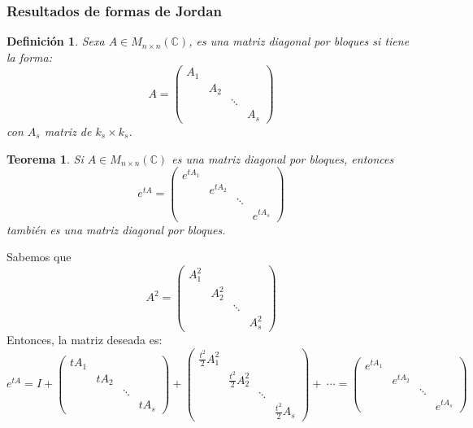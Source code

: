 \documentclass[11pt, a4paper,twoside]{article}
\makeatletter
\theoremstyle{theorem-style}  %
\newtheorem{theorem}{Teorema}[section]  %
\renewenvironment{proof}[1][\proofname]{\par
	\pushQED{\qed}%
	\normalfont \topsep6\p@\@plus6\p@\relax
	\list{}{%
		\settowidth{\leftmargin}{\quad:\hskip\labelsep}%
		\setlength{\labelwidth}{0pt}%
		\setlength{\itemindent}{-\leftmargin}%
	}%
	\item[\hskip\labelsep\itshape#1\@addpunct{:}]\ignorespaces
}{%
	\popQED\endlist\@endpefalse
}
\theoremstyle{definition-style}
\newtheorem{definition}{Definición}[section]
\theoremstyle{example-style}
\makeatother
\begin{document}
\subsubsection{Resultados de formas de Jordan}
\begin{definition}
	Sexa $ A\in M_{n\times n}(\mathbb{C}) $, es una matriz diagonal por bloques si tiene la forma:
	\[ A=\begin{pmatrix}
	A_{1}  \\
	& A_2  \\
	& & \ddots \\
	& & & A_s
	\end{pmatrix} \]
	con $ A_s $ matriz de $ k_s\times k_s $.
\end{definition}
\begin{theorem}
	Si $ A\in M_{n\times n}(\mathbb{C}) $ es una matriz diagonal por bloques, entonces 
	\[ e^{tA}= \begin{pmatrix}
	e^{tA_1}  \\
	& e^{tA_2}  \\
	& & \ddots \\
	& & & e^{tA_s}
	\end{pmatrix}\] también es una matriz diagonal por bloques.
\end{theorem}
\begin{proof}
	Sabemos que 
	\[ A^2=\begin{pmatrix}
	A_{1}^2  \\
	& A_2^2  \\
	& & \ddots \\
	& & & A_s^2
	\end{pmatrix} \]
	Entonces, la matriz deseada es:
	\[ e^{tA}=I+ \begin{pmatrix}
	tA_{1}  \\
	& tA_2  \\
	& & \ddots \\
	& & &t A_s
	\end{pmatrix} + \begin{pmatrix}
	\frac{t^2}{2}A_{1}^2  \\
	& \frac{t^2}{2}A_2^2  \\
	& & \ddots \\
	& & &\frac{t^2}{2} A_s
	\end{pmatrix}+ \ \cdots= \begin{pmatrix}
	e^{tA_1}  \\
	& e^{tA_2}  \\
	& & \ddots \\
	& & & e^{tA_s}
	\end{pmatrix} \]
\end{proof}
\end{document}
